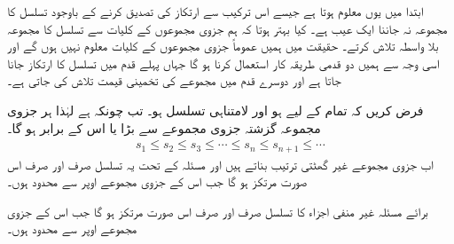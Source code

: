 ابتدا میں یوں معلوم ہوتا ہے جیسے اس ترکیب سے ارتکاز کی تصدیق کرنے کے باوجود تسلسل کا مجموعہ نہ جاننا ایک عیب ہے۔ کیا بہتر ہوتا کہ ہم جزوی مجموعوں کے کلیات سے تسلسل کا مجموعہ بلا واسطہ تلاش کرتے۔ حقیقت میں ہمیں عموماً جزوی مجموعوں کے کلیات معلوم نہیں ہوں گے  اور اسی وجہ سے ہمیں دو قدمی طریقہ کار استعمال کرنا ہو گا جہاں پہلے قدم میں تسلسل کا ارتکاز جانا جاتا ہے اور دوسرے قدم میں مجموعے کی تخمینی قیمت تلاش کی جاتی ہے۔ 

فرض کریں کہ تمام  کے لیے  ہو اور  لامتناہی تسلسل ہو۔
 تب چونکہ  ہے لہٰذا ہر جزوی مجموعہ گزشتہ جزوی مجموعے سے بڑا یا اس کے برابر ہو گا۔
\begin{align*}
s_1\le s_2\le s_3\le \cdots\le s_n\le s_{n+1}\le \cdots
\end{align*}
اب جزوی مجموعے غیر گھٹتی  ترتیب بناتے ہیں اور مسئلہ  کے تحت یہ تسلسل صرف اور صرف اس صورت مرتکز ہو گا جب اس کے جزوی مجموعے  اوپر سے محدود ہوں۔

 برائے مسئلہ 
غیر منفی اجزاء کا تسلسل  صرف اور صرف اس صورت مرتکز ہو گا جب اس کے جزوی مجموعے  اوپر سے محدود ہوں۔

